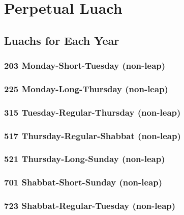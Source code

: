 \part{Perpetual Luach}





\chapter{Luachs for Each Year}
\togglefalse{leapyear}
\section{203 Monday-Short-Tuesday (non-leap)}
\label{702}
\tishreiMon

\section{225 Monday-Long-Thursday (non-leap)}
\label{225}
\tishreiMon

\section{315 Tuesday-Regular-Thursday (non-leap)}
\label{315}
\tishreiTues

\section{517 Thursday-Regular-Shabbat (non-leap)}
\label{517}
\tishreiThurs

\section{521 Thursday-Long-Sunday (non-leap)}
\label{521}
\tishreiThurs

\section{701 Shabbat-Short-Sunday (non-leap)}
\label{701}
\tishreiShab


\kislevTues

\tevetWens

\section{723 Shabbat-Regular-Tuesday (non-leap)}
\label{723}
\tishreiShab


